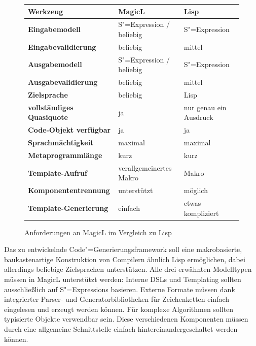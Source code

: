 \documentclass[12pt, a4paper, bibgerm]{scrbook}
\newcommand{\sexp}{S"=Expression}
\newcommand{\sexps}{S"=Expressions}
\newcommand{\cgen}{Code"=Generierung}
\begin{document}
\begin{figure}[h]
\begin{tabular}{|l|l|l|} \hline
\bf Werkzeug                 & \bf MagicL                    & \bf Lisp               \\\hline\hline    
\bf Eingabemodell            & \sexp{} / beliebig            & \sexp{}                \\\hline           
\bf Eingabevalidierung       & beliebig                      & mittel                 \\\hline      
\bf Ausgabemodell            & \sexp{} / beliebig            & \sexp{}                \\\hline      
\bf Ausgabevalidierung       & beliebig                      & mittel                 \\\hline      
\bf Zielsprache              & beliebig                      & Lisp                   \\\hline      
\bf vollständiges Quasiquote & ja                            & nur genau ein Ausdruck \\\hline      
\bf Code-Objekt verfügbar    & ja                            & ja                     \\\hline      
\bf Sprachmächtigkeit        & maximal                       & maximal                \\\hline      
\bf Metaprogrammlänge        & kurz                          & kurz                   \\\hline
\bf Template-Aufruf          & verallgemeinertes Makro       & Makro                  \\\hline      
\bf Komponententrennung      & unterstützt                   & möglich                \\\hline      
\bf Template-Generierung     & einfach                       & etwas kompliziert      \\\hline      
\end{tabular}
\caption{Anforderungen an MagicL im Vergleich zu Lisp}
\label{magicl:fig:reqs_sum}
\end{figure}

Das zu entwickelnde \cgen{}sframework soll eine makrobasierte,
baukastenartige Konstruktion von Compilern ähnlich Lisp ermöglichen,
dabei allerdings beliebige Zielsprachen unterstützen. Alle drei
erwähnten Modelltypen müssen in MagicL unterstützt werden: Interne DSLs
und Templating sollten ausschließlich auf \sexps{} basieren. Externe
Formate müssen dank integrierter Parser- und Generatorbibliotheken für
Zeichenketten einfach eingelesen und erzeugt werden können. Für komplexe
Algorithmen sollten typisierte Objekte verwendbar sein. Diese
verschiedenen Komponenten müssen durch eine allgemeine Schnittstelle
einfach hintereinandergeschaltet werden können.
\end{document}
